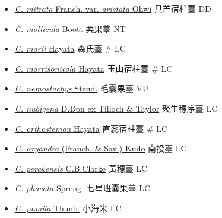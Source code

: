 \begin{itemize}
\begin{itemize}
        \item[] \href{http://www.theplantlist.org/tpl1.1/search?q=Carex+mitrata+var.+aristata}{\textit{C. mitrata} Franch. var. \textit{aristata} Ohwi}   具芒宿柱薹   DD
        \item[] \href{http://www.theplantlist.org/tpl1.1/search?q=Carex+mollicula}{\textit{C. mollicula} Boott}   柔果薹   NT
        \item[] \href{http://www.theplantlist.org/tpl1.1/search?q=Carex+morii}{\textit{C. morii} Hayata}   森氏薹  \# LC
        \item[] \href{http://www.theplantlist.org/tpl1.1/search?q=Carex+morrisonicola}{\textit{C. morrisonicola} Hayata}   玉山宿柱薹  \# LC
        \item[] \href{http://www.theplantlist.org/tpl1.1/search?q=Carex+nemostachys}{\textit{C. nemostachys} Steud.}   毛囊果薹   VU
        \item[] \href{http://www.theplantlist.org/tpl1.1/search?q=Carex+nubigena}{\textit{C. nubigena} D.Don ex Tilloch \& Taylor}   聚生穗序薹   LC
        \item[] \href{http://www.theplantlist.org/tpl1.1/search?q=Carex+orthostemon}{\textit{C. orthostemon} Hayata}   直蕊宿柱薹  \# LC
        \item[] \href{http://www.theplantlist.org/tpl1.1/search?q=Carex+oxyandra}{\textit{C. oxyandra} (Franch. \& Sav.) Kudo}   南投薹   LC
        \item[] \href{http://www.theplantlist.org/tpl1.1/search?q=Carex+perakensis}{\textit{C. perakensis} C.B.Clarke}   黃穗薹   LC
        \item[] \href{http://www.theplantlist.org/tpl1.1/search?q=Carex+phacota}{\textit{C. phacota} Spreng.}   七星班囊果薹   LC
        \item[] \href{http://www.theplantlist.org/tpl1.1/search?q=Carex+pumila}{\textit{C. pumila} Thunb.}   小海米   LC

\end{itemize}
\end{itemize}
